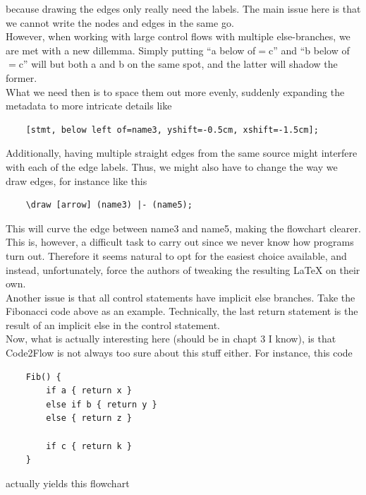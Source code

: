 because drawing the edges only really need the labels. The main issue here is that we cannot write the nodes and edges in the same go. \\

However, when working with large control flows with multiple else-branches, we are met with a new dillemma. Simply putting ``a below of$=$c'' and ``b below of$=$c'' will but both a and b on the same spot, and the latter will shadow the former. \\

What we need then is to space them out more evenly, suddenly expanding the metadata to more intricate details like

\begin{lstlisting}
    [stmt, below left of=name3, yshift=-0.5cm, xshift=-1.5cm];
\end{lstlisting}

Additionally, having multiple straight edges from the same source might interfere with each of the edge labels. Thus, we might also have to change the way we draw edges, for instance like this

\begin{lstlisting}
    \draw [arrow] (name3) |- (name5);
\end{lstlisting}

This will curve the edge between name3 and name5, making the flowchart clearer. This is, however, a difficult task to carry out since we never know how programs turn out. Therefore it seems natural to opt for the easiest choice available, and instead, unfortunately, force the authors of tweaking the resulting LaTeX on their own. \\

Another issue is that all control statements have implicit else branches. Take the Fibonacci code above as an example. Technically, the last return statement is the result of an implicit else in the control statement. \\

Now, what is actually interesting here (should be in chapt 3 I know), is that Code2Flow is not always too sure about this stuff either. For instance, this code

\begin{lstlisting}
    Fib() {
        if a { return x }
        else if b { return y }
        else { return z }

        if c { return k }
    }
\end{lstlisting}

actually yields this flowchart

